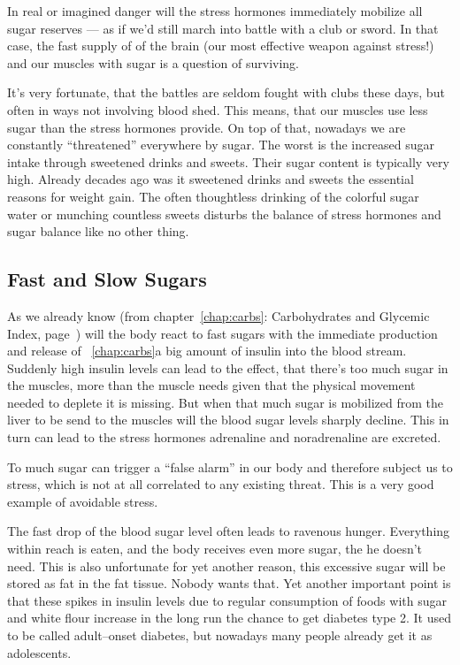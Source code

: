 \documentclass[../main.tex]{subfiles}
\begin{document}
In real or imagined danger will the stress hormones immediately mobilize all sugar reserves ---
as if we'd still march into battle with a club or sword.
In that case, the fast supply of of the brain (our most effective weapon against stress!) and our muscles with sugar
is a question of surviving.

It's very fortunate, that the battles are seldom fought with clubs these days, but often in ways not involving blood shed.
This means, that our muscles use less sugar than the stress hormones provide.
On top of that, nowadays we are constantly ``threatened'' everywhere by sugar.
The worst is the increased sugar intake through sweetened drinks and sweets.
Their sugar content is typically very high.
Already decades ago was it sweetened drinks and sweets the essential reasons for weight gain.
The often thoughtless drinking of the colorful sugar water or munching countless sweets disturbs the balance
of stress hormones and sugar balance like no other thing.

\subsection{Fast and Slow Sugars}

As we already know (from chapter~\ref{chap:carbs}: Carbohydrates and Glycemic Index, page~\pageref{chap:carbs}) will the body react
to fast sugars with the immediate production and release of ~\ref{chap:carbs}a big amount of insulin into the blood stream.
Suddenly high insulin levels can lead to the effect, that there's too much sugar in the muscles, more than the muscle needs
given that the physical movement needed to deplete it is missing.
But when that much sugar is mobilized from the liver to be send to the muscles will the blood sugar levels sharply decline.
This in turn can lead to the stress hormones adrenaline and noradrenaline are excreted.

To much sugar can trigger a ``false alarm'' in our body and therefore subject us to stress, which is not at all correlated to any existing threat.
This is a very good example of avoidable stress.

The fast drop of the blood sugar level often leads to ravenous hunger.
Everything within reach is eaten, and the body receives even more sugar, the he doesn't need.
This is also unfortunate for yet another reason, this excessive sugar will be stored as fat in the fat tissue. Nobody wants that.
Yet another important point is that these spikes in insulin levels due to regular consumption of foods with sugar and white flour increase in the
long run the chance to get diabetes type 2.
It used to be called adult--onset diabetes, but nowadays many people already get it as adolescents.
\end{document}
